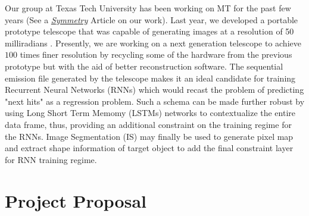 \documentclass[10pt]{article}
\begin{document}

\vspace{2mm}

\hspace{10mm} Our group at Texas Tech University has been working on MT for the past few years (See a \href{https://www.symmetrymagazine.org/article/archaeology-meets-particle-physics}{\textit{Symmetry}} Article on our work). Last year, we developed a portable prototype telescope that was capable of generating images at a resolution of 50 milliradians \cite{mt_paper}. Presently, we are working on a next generation telescope to achieve $100$ times finer resolution by recycling some of the hardware from the previous prototype but with the aid of better reconstruction software. The sequential emission file generated by the telescope makes it an ideal candidate for training Recurrent Neural Networks (RNNs) which would recast the problem of predicting "next hits" as a regression problem\cite{rnn_paper, old}. Such a schema can be made further robust by using Long Short Term Memomy (LSTMs) networks to contextualize the entire data frame, thus, providing an additional constraint on the training regime for the RNNs. Image Segmentation (IS) may finally be used to generate pixel map and extract shape information of target object to add the final constraint layer for RNN training regime.

\section{Project Proposal}
\end{document}
